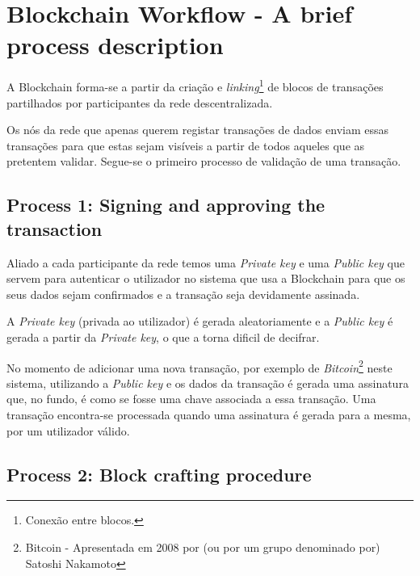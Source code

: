 \documentclass{llncs}
\begin{document}
\section{Blockchain Workflow - A brief process description}

	A Blockchain forma-se a partir da criação e \textit{linking}\footnote{Conexão entre blocos.} de blocos de transações partilhados por participantes da rede descentralizada.  \par

    \vspace{0.05cm}

	Os nós da rede que apenas querem registar transações de dados enviam essas transações para que estas sejam visíveis a partir de todos aqueles que as pretentem validar. Segue-se o primeiro processo de validação de uma transação. \par


\subsection{Process 1: Signing and approving the transaction}

	Aliado a cada participante da rede temos uma \textit{Private key} e uma \textit{Public key} que servem para autenticar o utilizador no sistema que usa a Blockchain para que os seus dados sejam confirmados e a transação seja devidamente assinada. \par

	\vspace{0.05cm}

    A \textit{Private key} (privada ao utilizador) é gerada aleatoriamente e a \textit{Public key} é gerada a partir da \textit{Private key}, o que a torna dificil de decifrar. \par

	No momento de adicionar uma nova transação, por exemplo de \textit{Bitcoin}\footnote{Bitcoin - Apresentada em 2008 por (ou por um grupo denominado por) Satoshi Nakamoto} neste sistema, utilizando a \textit{Public key} e os dados da transação é gerada uma assinatura que, no fundo, é como se fosse uma chave associada a essa transação.	Uma transação encontra-se processada quando uma assinatura é gerada para a mesma, por um utilizador válido. \par

\subsection{Process 2: Block crafting procedure}
\end{document}
